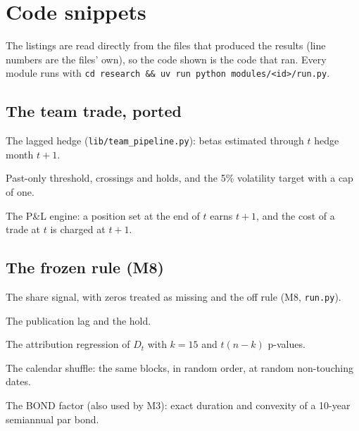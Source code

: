 \clearpage
\section{Code snippets}
\label{app:code}

The listings are read directly from the files that produced the results (line numbers are the files' own), so the code shown is the code that ran. Every module runs with \texttt{cd research \&\& uv run python modules/<id>/run.py}.

\subsection{The team trade, ported}
The lagged hedge (\texttt{lib/team\_pipeline.py}): betas estimated through $t$ hedge month $t+1$.

Past-only threshold, crossings and holds, and the 5\% volatility target with a cap of one.



The P\&L engine: a position set at the end of $t$ earns $t+1$, and the cost of a trade at $t$ is charged at $t+1$.


\subsection{The frozen rule (M8)}
The share signal, with zeros treated as missing and the off rule (M8, \texttt{run.py}).

The publication lag and the hold.

The attribution regression of $D_t$ with $k=15$ and $t(n-k)$ p-values.

The calendar shuffle: the same blocks, in random order, at random non-touching dates.

The BOND factor (also used by M3): exact duration and convexity of a 10-year semiannual par bond.



